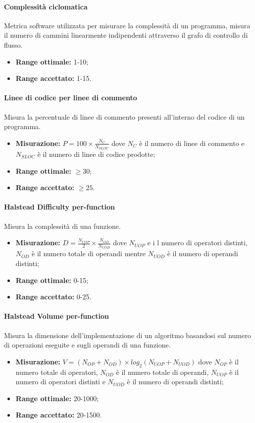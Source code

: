 			\paragraph{Complessità ciclomatica} \Spazio
			Metrica software utilizzata per misurare la complessità di un programma, misura il numero di cammini linearmente indipendenti attraverso il grafo di controllo di flusso.
			\begin{itemize}
				\item \textbf{Range ottimale:} 1-10;
				\item \textbf{Range accettato:} 1-15.
			\end{itemize}
			\paragraph{Linee di codice per linee di commento} \Spazio
			Misura la percentuale di linee di commento presenti all'interno del codice di un programma.
			\begin{itemize}
				\item \textbf{Misurazione:} $P=100\times\frac{N_C}{N_{SLOC}}$ dove $N_C$ è il numero di linee di commento e $N_{SLOC}$ è il numero di linee di codice prodotte;
				\item \textbf{Range ottimale:} $\geq30$;
				\item \textbf{Range accettato:} $\geq25$.
			\end{itemize}
			\paragraph{Halstead Difficulty per-function} \Spazio
			Misura la complessità di una funzione.
			\begin{itemize}
				\item \textbf{Misurazione:} $D=\frac{N_{UOP}}{2}\times\frac{N_{OD}}{N_{UOD}}$ dove $N_{UOP}$ e i l numero di operatori distinti, $N_{OD}$ è il numero totale di operandi mentre $N_{UOD}$ è il numero di operandi distinti;
				\item \textbf{Range ottimale:} 0-15;
				\item \textbf{Range accettato:} 0-25.
			\end{itemize}
			\paragraph{Halstead Volume per-function} \Spazio
			Misura la dimensione dell'implementazione di un algoritmo basandosi sul numero di operazioni eseguite e sugli operandi di una funzione.
			\begin{itemize}
				\item \textbf{Misurazione:} $V=(N_{OP} + N_{OD})\times log_2(N_{UOP} + N_{UOD})$  dove $N_{OP}$ è il numero totale di operatori, $N_{OD}$ è il numero totale di operandi, $N_{UOP}$ è
				il numero di operatori distinti e $N_{UOD}$ è il numero di operandi distinti;
			\item \textbf{Range ottimale:} 20-1000;
			\item \textbf{Range accettato:} 20-1500.
			\end{itemize}
